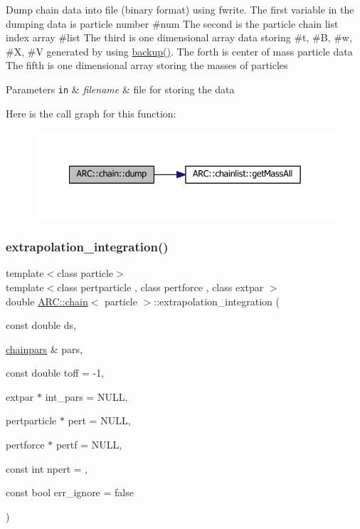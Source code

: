 Dump chain data into file (binary format) using fwrite. The first variable in the dumping data is particle number \#num The second is the particle chain list index array \#list The third is one dimensional array data storing \#t, \#B, \#w, \#X, \#V generated by using \hyperlink{classARC_1_1chain_a587009b6c6db0490c0f335aba732d77a}{backup()}. The forth is center of mass particle data The fifth is one dimensional array storing the masses of particles 
\begin{DoxyParams}[1]{Parameters}
\mbox{\tt in}  & {\em filename} & file for storing the data \\
\hline
\end{DoxyParams}
Here is the call graph for this function\+:
\nopagebreak
\begin{figure}[H]
\begin{center}
\leavevmode
\includegraphics[width=342pt]{classARC_1_1chain_adefda13efa8a0a22e4597600ea1bc193_cgraph}
\end{center}
\end{figure}
\hypertarget{classARC_1_1chain_adedfb41cd82c64ca09dbc55a76b145fc}{}\label{classARC_1_1chain_adedfb41cd82c64ca09dbc55a76b145fc} 
\subsubsection{\texorpdfstring{extrapolation\+\_\+integration()}{extrapolation\_integration()}}
{\footnotesize\ttfamily template$<$class particle$>$ \\
template$<$class pertparticle , class pertforce , class extpar $>$ \\
double \hyperlink{classARC_1_1chain}{A\+R\+C\+::chain}$<$ particle $>$\+::extrapolation\+\_\+integration (\begin{DoxyParamCaption}\item[{const double}]{ds,  }\item[{\hyperlink{classARC_1_1chainpars}{chainpars} \&}]{pars,  }\item[{const double}]{toff = {\ttfamily -\/1},  }\item[{extpar $\ast$}]{int\+\_\+pars = {\ttfamily NULL},  }\item[{pertparticle $\ast$}]{pert = {\ttfamily NULL},  }\item[{pertforce $\ast$}]{pertf = {\ttfamily NULL},  }\item[{const int}]{npert = {},  }\item[{const bool}]{err\+\_\+ignore = {\ttfamily false} }\end{DoxyParamCaption})\hspace{0.3cm}{\ttfamily [inline]}}



